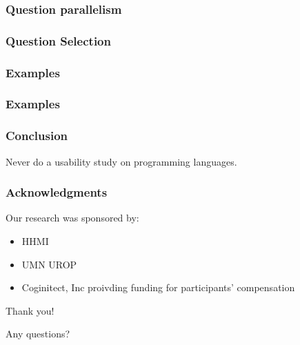 \documentclass{beamer}
\begin{document}
\begin{frame}
\frametitle{Question parallelism}
\end{frame}


\begin{frame}
\frametitle{Question Selection}
\end{frame}


\begin{frame}
\frametitle{Examples}
\end{frame}

\begin{frame}
\frametitle{Examples}
\end{frame}

\begin{frame}
\frametitle{Conclusion}
	Never do a usability study on programming languages.
\end{frame}

\begin{frame}
\frametitle{Acknowledgments}
	Our research was sponsored by:
	\begin{itemize}
	\item HHMI
	\item UMN UROP
          \item Coginitect, Inc proivding funding for participants' compensation 
	\end{itemize}
	
	
	{\centering
	\noindent
	Thank you! \par
	Any questions? \par
	}
\end{frame}
\end{document}
